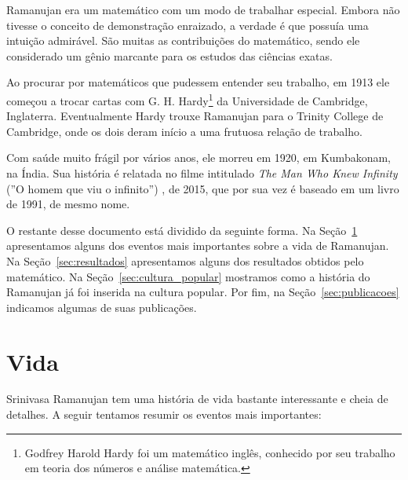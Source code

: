 \documentclass[12pt, a4paper]{article}
\begin{document}
Ramanujan era um matemático com um modo de trabalhar especial.  Embora não
tivesse o conceito de demonstração enraizado, a verdade é que possuía uma
intuição admirável.  São muitas as contribuições do matemático, sendo ele
considerado um gênio marcante para os estudos das ciências exatas.

Ao procurar por matemáticos que pudessem entender seu trabalho, em 1913 ele
começou a trocar cartas com G. H. Hardy\footnote{Godfrey Harold Hardy foi um 
matemático inglês, conhecido por seu trabalho em teoria dos números e análise 
matemática.} da Universidade de Cambridge, Inglaterra.  Eventualmente Hardy 
trouxe Ramanujan para o Trinity College de
Cambridge, onde os dois deram início a uma frutuosa relação de trabalho.

Com saúde muito frágil por vários anos, ele morreu em 1920, em Kumbakonam, na
Índia.  Sua história é relatada no filme intitulado \textit{The Man Who Knew 
Infinity} (''O homem que viu o infinito'')
, de 2015, 
que por sua vez é baseado em um livro de 1991, de mesmo nome.

O restante desse documento está dividido da seguinte forma. Na
Seção~\ref{sec:vida} apresentamos alguns dos eventos mais importantes sobre a 
vida de Ramanujan. Na Seção~\ref{sec:resultados} apresentamos alguns dos 
resultados obtidos pelo matemático. Na Seção~\ref{sec:cultura_popular} mostramos 
como a história do Ramanujan já foi inserida na cultura popular. Por fim, na 
Seção~\ref{sec:publicacoes} indicamos algumas de suas publicações.

\section{Vida}\label{sec:vida}

\noindent 
Srinivasa Ramanujan tem uma história de vida bastante interessante e cheia de
detalhes. A seguir tentamos resumir os eventos mais importantes:
\end{document}

